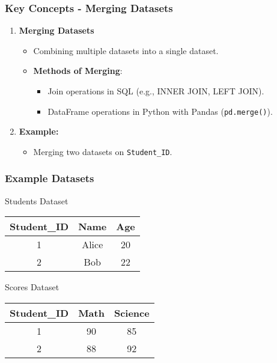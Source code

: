 \documentclass[aspectratio=169]{beamer}
\begin{document}
\begin{frame}
    \frametitle{Key Concepts - Merging Datasets}
    \begin{enumerate}
        \item \textbf{Merging Datasets}
        \begin{itemize}
            \item Combining multiple datasets into a single dataset.
            \item \textbf{Methods of Merging}:
            \begin{itemize}
                \item Join operations in SQL (e.g., INNER JOIN, LEFT JOIN).
                \item DataFrame operations in Python with Pandas (\texttt{pd.merge()}).
            \end{itemize}
        \end{itemize}
        \item \textbf{Example:}
        \begin{itemize}
            \item Merging two datasets on \texttt{Student\_ID}.
        \end{itemize}
    \end{enumerate}
\end{frame}

\begin{frame}[fragile]
    \frametitle{Example Datasets}
    \begin{block}{Students Dataset}
    \begin{tabular}{|c|c|c|}
        \hline
        Student\_ID & Name  & Age \\
        \hline
        1          & Alice & 20  \\
        2          & Bob   & 22  \\
        \hline
    \end{tabular}
    \end{block}
    \begin{block}{Scores Dataset}
    \begin{tabular}{|c|c|c|}
        \hline
        Student\_ID & Math & Science \\
        \hline
        1          & 90   & 85      \\
        2          & 88   & 92      \\
        \hline
    \end{tabular}
    \end{block}
\end{frame}
\end{document}
